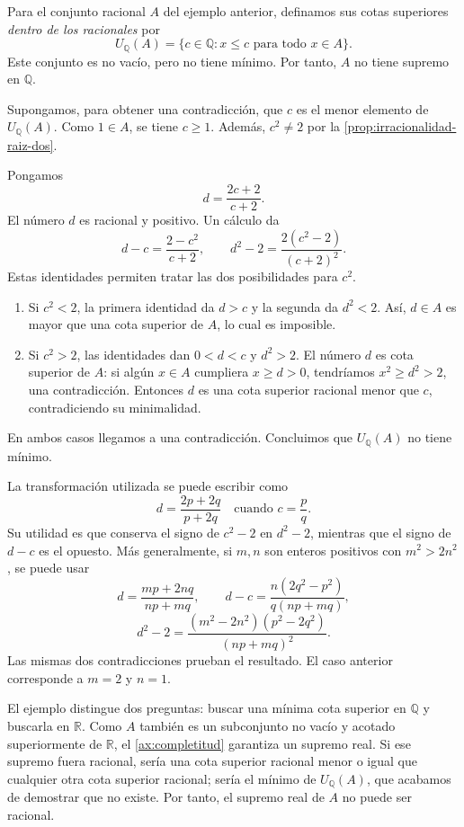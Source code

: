 \begin{example}
\label{ej:incompletitud-racionales}
Para el conjunto racional $A$ del ejemplo anterior, definamos sus cotas superiores \emph{dentro de los racionales} por
\[
 U_{\mathbb{Q}}(A)=
 \{c\in\mathbb{Q}:x\leq c\text{ para todo }x\in A\}.
\]
Este conjunto es no vacío, pero no tiene mínimo. Por tanto, $A$ no tiene supremo en $\mathbb{Q}$.

Supongamos, para obtener una contradicción, que $c$ es el menor elemento de $U_{\mathbb{Q}}(A)$. Como $1\in A$, se tiene $c\geq1$. Además, $c^2\neq2$ por la \cref{prop:irracionalidad-raiz-dos}.

Pongamos
\[
 d=\frac{2c+2}{c+2}.
\]
El número $d$ es racional y positivo. Un cálculo da
\[
 d-c=\frac{2-c^2}{c+2},
 \qquad
 d^2-2=\frac{2(c^2-2)}{(c+2)^2}.
\]
Estas identidades permiten tratar las dos posibilidades para $c^2$.
\begin{enumerate}
    \item Si $c^2<2$, la primera identidad da $d>c$ y la segunda da $d^2<2$. Así, $d\in A$ es mayor que una cota superior de $A$, lo cual es imposible.
    \item Si $c^2>2$, las identidades dan $0<d<c$ y $d^2>2$. El número $d$ es cota superior de $A$: si algún $x\in A$ cumpliera $x\geq d>0$, tendríamos $x^2\geq d^2>2$, una contradicción. Entonces $d$ es una cota superior racional menor que $c$, contradiciendo su minimalidad.
\end{enumerate}
En ambos casos llegamos a una contradicción. Concluimos que $U_{\mathbb{Q}}(A)$ no tiene mínimo.
\end{example}

\begin{remark}
La transformación utilizada se puede escribir como
\[
 d=\frac{2p+2q}{p+2q}
 \quad\text{cuando }c=\frac pq.
\]
Su utilidad es que conserva el signo de $c^2-2$ en $d^2-2$, mientras que el signo de $d-c$ es el opuesto. Más generalmente, si $m,n$ son enteros positivos con $m^2>2n^2$, se puede usar
\[
 d=\frac{mp+2nq}{np+mq},
 \qquad
 d-c=\frac{n(2q^2-p^2)}{q(np+mq)},
\]
\[
 d^2-2=\frac{(m^2-2n^2)(p^2-2q^2)}{(np+mq)^2}.
\]
Las mismas dos contradicciones prueban el resultado. El caso anterior corresponde a $m=2$ y $n=1$.
\end{remark}

El ejemplo distingue dos preguntas: buscar una mínima cota superior en $\mathbb{Q}$ y buscarla en $\mathbb{R}$. Como $A$ también es un subconjunto no vacío y acotado superiormente de $\mathbb{R}$, el \cref{ax:completitud} garantiza un supremo real. Si ese supremo fuera racional, sería una cota superior racional menor o igual que cualquier otra cota superior racional; sería el mínimo de $U_{\mathbb{Q}}(A)$, que acabamos de demostrar que no existe. Por tanto, el supremo real de $A$ no puede ser racional.


